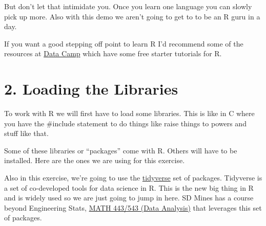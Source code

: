 \documentclass[]{article}
\begin{document}
But don't let that intimidate you. Once you learn one language you can
slowly pick up more. Also with this demo we aren't going to get to to be
an R guru in a day.

If you want a good stepping off point to learn R I'd recommend some of
the resources at
\href{https://www.datacamp.com/courses/free-introduction-to-r}{Data
Camp} which have some free starter tutorials for R.

\hypertarget{loading-the-libraries}{%
\section{2. Loading the Libraries}\label{loading-the-libraries}}

To work with R we will first have to load some libraries. This is like
in C where you have the \#include statement to do things like raise
things to powers and stuff like that.

Some of these libraries or ``packages'' come with R. Others will have to
be installed. Here are the ones we are using for this exercise.

Also in this exercise, we're going to use the
\href{https://www.tidyverse.org}{tidyverse} set of packages. Tidyverse
is a set of co-developed tools for data science in R. This is the new
big thing in R and is widely used so we are just going to jump in here.
SD Mines has a course beyond Engineering Stats,
\href{http://ecatalog.sdsmt.edu/preview_course_nopop.php?catoid=17\&coid=26973}{MATH
443/543 (Data Analysis)} that leverages this set of packages.
\end{document}
